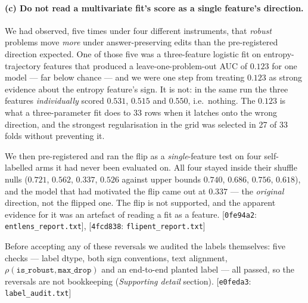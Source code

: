 \documentclass[10pt]{article}
\newcommand{\cmt}[2]{{\footnotesize\textsf{[}\texttt{#1}\textsf{:} #2\textsf{]}}}
\begin{document}
\paragraph{(c) Do not read a multivariate fit's score as a single feature's direction.} We had
observed, five times under four different instruments, that \emph{robust} problems move \emph{more}
under answer-preserving edits than the pre-registered direction expected. One of those five was a
three-feature logistic fit on entropy-trajectory features that produced a leave-one-problem-out AUC
of $\mathbf{0.123}$ for one model --- far below chance --- and we were one step from treating
$0.123$ as strong evidence about the entropy feature's sign. It is not: in the same run the three
features \emph{individually} scored $0.531$, $0.515$ and $0.550$, i.e.\ nothing. The $0.123$ is what
a three-parameter fit does to 33 rows when it latches onto the wrong direction, and the strongest
regularisation in the grid was selected in 27 of 33 folds without preventing it.

We then pre-registered and ran the flip as a \emph{single}-feature test on four self-labelled arms it
had never been evaluated on. All four stayed inside their shuffle nulls ($0.721$, $0.562$, $0.337$,
$0.526$ against upper bounds $0.740$, $0.686$, $0.756$, $0.618$), and the model that had motivated
the flip came out at $0.337$ --- the \emph{original} direction, not the flipped one. The flip is not
supported, and the apparent evidence for it was an artefact of reading a fit as a feature.
\cmt{0fe94a2}{\texttt{entlens\_report.txt}}, \cmt{4fcd838}{\texttt{flipent\_report.txt}}

Before accepting any of these reversals we audited the labels themselves: five checks --- label
dtype, both sign conventions, text alignment, $\rho(\texttt{is\_robust}, \texttt{max\_drop})$ and an
end-to-end planted label --- all passed, so the reversals are not bookkeeping
(\emph{Supporting detail} section). \cmt{e0feda3}{\texttt{label\_audit.txt}}
\end{document}
